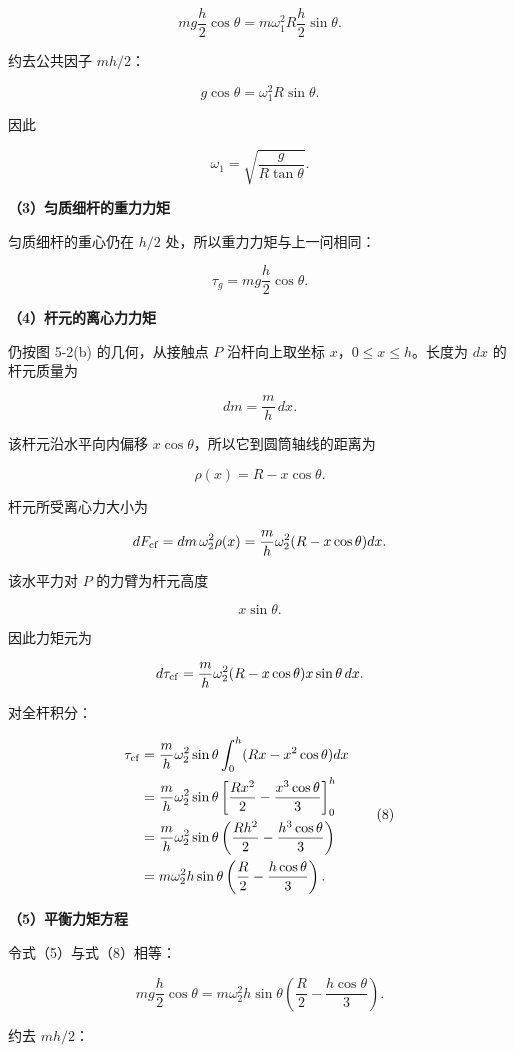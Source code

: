 \documentclass[12pt,a4paper,UTF8]{ctexart}
\begin{document}
\[
mg\frac h2\cos\theta
=m\omega_1^2R\frac h2\sin\theta.
\]

约去公共因子 \(mh/2\)：

\[
g\cos\theta=\omega_1^2R\sin\theta.
\]

因此

\[
\boxed{
\omega_1
=\sqrt{\frac{g}{R\tan\theta}}
}.\tag{4}
\]

\textbf{（3）匀质细杆的重力力矩}

匀质细杆的重心仍在 \(h/2\) 处，所以重力力矩与上一问相同：

\[
\tau_g=mg\frac h2\cos\theta.\tag{5}
\]

\textbf{（4）杆元的离心力力矩}

仍按图 5-2(b) 的几何，从接触点 \(P\) 沿杆向上取坐标
\(x\)，\(0\leq x\leq h\)。长度为 \(dx\) 的杆元质量为

\[
dm=\frac mh\,dx.\tag{6}
\]

该杆元沿水平向内偏移 \(x\cos\theta\)，所以它到圆筒轴线的距离为

\[
\rho(x)=R-x\cos\theta.\tag{7}
\]

杆元所受离心力大小为

\[
dF_{\rm cf}=dm\,\omega_2^2\rho(x)
=\frac mh\omega_2^2(R-x\cos\theta)dx.
\]

该水平力对 \(P\) 的力臂为杆元高度

\[
x\sin\theta.
\]

因此力矩元为

\[
d\tau_{\rm cf}
=\frac mh\omega_2^2(R-x\cos\theta)x\sin\theta\,dx.
\]

对全杆积分：

\[
\begin{aligned}
\tau_{\rm cf}
&=\frac mh\omega_2^2\sin\theta
\int_0^h(Rx-x^2\cos\theta)dx\\
&=\frac mh\omega_2^2\sin\theta
\left[
\frac{Rx^2}{2}-\frac{x^3\cos\theta}{3}
\right]_0^h\\
&=\frac mh\omega_2^2\sin\theta
\left(
\frac{Rh^2}{2}-\frac{h^3\cos\theta}{3}
\right)\\
&=m\omega_2^2h\sin\theta
\left(
\frac R2-\frac{h\cos\theta}{3}
\right).
\end{aligned}\tag{8}
\]

\textbf{（5）平衡力矩方程}

令式（5）与式（8）相等：

\[
mg\frac h2\cos\theta
=m\omega_2^2h\sin\theta
\left(
\frac R2-\frac{h\cos\theta}{3}
\right).
\]

约去 \(mh/2\)：
\end{document}
